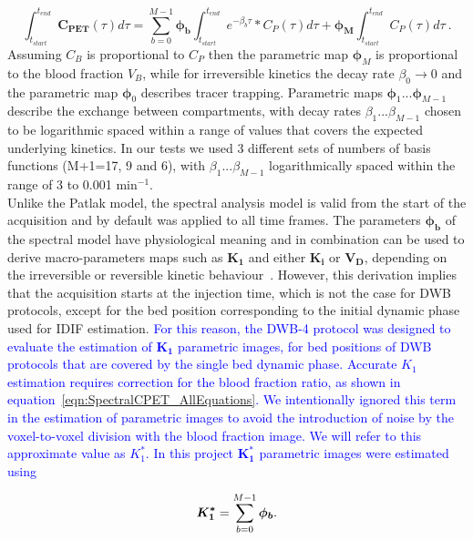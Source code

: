 \begin{itemize}
\begin{equation} \label{SpectralEq}
\int_{t_{start}}^{t_{end}} \boldsymbol{C_{PET}}(\tau) d\tau =  \sum_{b=0}^{M-1}  \boldsymbol{\phi_b} \int_{t_{start}}^{t_{end}} e^{-\beta_b \tau} \ast C_P(\tau)  d\tau +\boldsymbol{\phi_M} \int_{t_{start}}^{t_{end}} C_{P}(\tau) d\tau   \ .
\end{equation}
Assuming $C_{B}$ is proportional to $C_{P}$ then the parametric map $\boldsymbol\phi_M$ is proportional to the blood fraction $V_B$, while for irreversible kinetics the decay rate $\beta_0\xrightarrow{}0$ and the parametric map $\boldsymbol\phi_0$ describes tracer trapping. Parametric maps $\boldsymbol{\phi}_1 ... \boldsymbol{\phi}_{M-1}$ describe the exchange between compartments, with decay rates $\beta_1 ... \beta_{M-1}$
chosen to be logarithmic spaced within a range of values that covers the expected underlying kinetics. 
In our tests we used 3 different sets of numbers of basis functions (M+1=17, 9 and 6), with $\beta_1 ... \beta_{M-1}$ logarithmically spaced within the range of 3 to 0.001 $\mathrm{min}^{-1}$. \\
Unlike the Patlak model, the spectral analysis model is valid from the start of the acquisition and by default was applied to all time frames. The parameters $\boldsymbol{\phi_b}$ of the spectral model have physiological meaning and in combination can be used to derive macro-parameters maps such as $\boldsymbol{K_1}$ and either $\boldsymbol{K_i}$ or $\boldsymbol{V_D}$, 
depending on the irreversible or reversible kinetic behaviour~\cite{Gunn2002}.
However, this derivation implies that the acquisition starts at the injection time, which is not the case for DWB protocols, except for the bed position corresponding to the initial dynamic phase used for IDIF estimation. 
\textcolor{blue}{For this reason, the DWB-4 protocol was designed to evaluate the estimation of $\boldsymbol{K_1}$ parametric images, for bed positions of DWB protocols that are covered by the single bed dynamic phase. Accurate $K_1$ estimation requires correction for the blood fraction ratio, as shown in equation~\ref{eqn:SpectralCPET_AllEquations}. We intentionally ignored this term in the estimation of parametric images to avoid the introduction of noise by the voxel-to-voxel division with the blood fraction image. We will refer to this approximate value as $K_1^*$. In this project $\boldsymbol{K_1^*}$ parametric images were estimated using}

\begin{equation} \label{SpectralK1}
\boldsymbol{K_1^*} = \sum_{b=0}^{M-1} \boldsymbol{\phi_b} \\ . \\
\end{equation}


\end{itemize}
